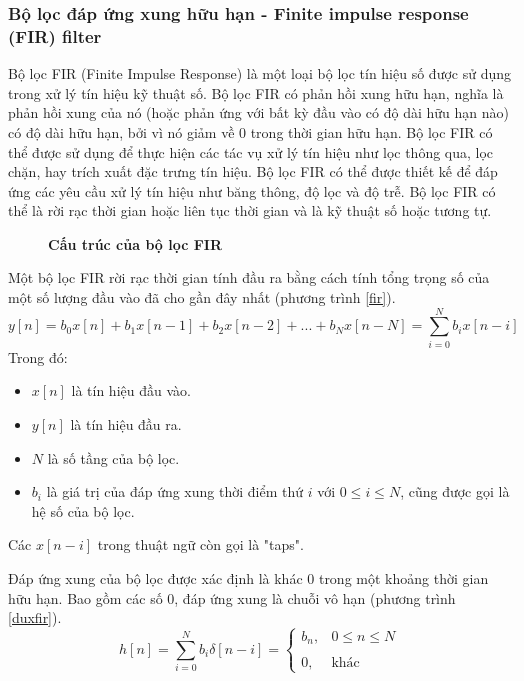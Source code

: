 \subsubsection{Bộ lọc đáp ứng xung hữu hạn -  Finite impulse response (FIR) filter}
Bộ lọc FIR (Finite Impulse Response) là một loại bộ lọc tín hiệu số được sử dụng trong xử lý tín hiệu kỹ thuật số. Bộ lọc FIR có phản hồi xung hữu hạn, nghĩa là phản hồi xung của nó (hoặc phản ứng với bất kỳ đầu vào có độ dài hữu hạn nào) có độ dài hữu hạn, bởi vì nó giảm về 0 trong thời gian hữu hạn. Bộ lọc FIR có thể được sử dụng để thực hiện các tác vụ xử lý tín hiệu như lọc thông qua, lọc chặn, hay trích xuất đặc trưng tín hiệu. Bộ lọc FIR có thể được thiết kế để đáp ứng các yêu cầu xử lý tín hiệu như băng thông, độ lọc và độ trễ. Bộ lọc FIR có thể là rời rạc thời gian hoặc liên tục thời gian và là kỹ thuật số hoặc tương tự. \cite{8256573}
\begin{figure}[H]
    \centering
    
    \caption[Cấu trúc của bộ lọc FIR]{\bfseries \fontsize{12pt}{0pt}\selectfont Cấu trúc của bộ lọc FIR}
    \label{FIR_Filter}
\end{figure}
Một bộ lọc FIR rời rạc thời gian tính đầu ra bằng cách tính tổng trọng số của một số lượng đầu vào đã cho gần đây nhất (phương trình \ref{fir}).
\begin{equation}\label{fir}
       y[n]= b_0x[n] + b_1x[n-1] + b_2x[n-2] + ... + b_Nx[n-N] = \sum^{N}_{i=0}b_ix[n - i]
\end{equation}
Trong đó:
\begin{itemize}
  \item $x[n]$ là tín hiệu đầu vào.
  \item $y[n]$ là tín hiệu đầu ra.
  \item $N$ là số tầng của bộ lọc.
  \item $b_i$ là giá trị của đáp ứng xung thời điểm thứ $i$ với $0 \leq i \leq N$, cũng được gọi là hệ số của bộ lọc.
\end{itemize}

Các $x[n-i]$ trong thuật ngữ còn gọi là "taps". 

Đáp ứng xung của bộ lọc được xác định là khác 0 trong một khoảng thời gian hữu hạn. Bao gồm các số 0, đáp ứng xung là chuỗi vô hạn (phương trình \ref{duxfir}).
\begin{equation}\label{duxfir}
    h[n] = \sum ^{N}_{i=0}b_i\delta[n-i]=\left\{\begin{matrix}b_n,& 0 \leq n \leq N
    \\&
\\ 0, & \text{khác}
\end{matrix}\right.
\end{equation}

